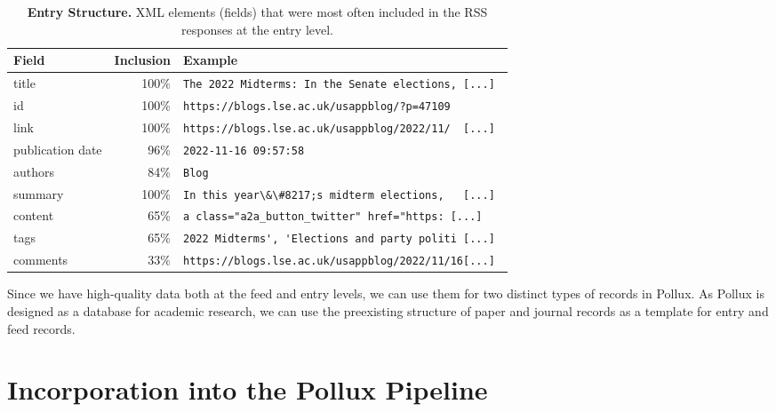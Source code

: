 \documentclass{article}
\begin{document}
\begin{table}[htb]
    \caption{\textbf{Entry Structure.} XML elements (fields) that were most often included in the RSS responses at the entry level.}
    \centering
    \begin{tabular}{lrl}
        \toprule
        \cmidrule(r){1-2}
        \textbf{Field}   & \textbf{Inclusion} & \textbf{Example}                                          \\
        \midrule
        title            & 100\%              & \verb|The 2022 Midterms: In the Senate elections, [...] | \\
        id               & 100\%              & \verb|https://blogs.lse.ac.uk/usappblog/?p=47109        | \\
        link             & 100\%              & \verb|https://blogs.lse.ac.uk/usappblog/2022/11/  [...] | \\
        publication date & 96\%               & \verb|2022-11-16 09:57:58|                                \\
        authors          & 84\%               & \verb|Blog|                                               \\
        summary          & 100\%              & \verb|In this year\&\#8217;s midterm elections,   [...] | \\
        content          & 65\%               & \verb|a class="a2a_button_twitter" href="https: [...] |   \\
        tags             & 65\%               & \verb|2022 Midterms', 'Elections and party politi [...] | \\
        comments         & 33\%               & \verb|https://blogs.lse.ac.uk/usappblog/2022/11/16[...] | \\
        \bottomrule
    \end{tabular}
    \label{tab:entry_structure}
\end{table}

Since we have high-quality data both at the feed and entry levels, we can use them for two distinct types of records in Pollux. As Pollux is designed as a database for academic research, we can use the preexisting structure of paper and journal records as a template for entry and feed records.

\section{Incorporation into the Pollux Pipeline}\label{sec:incorporation}
\end{document}
